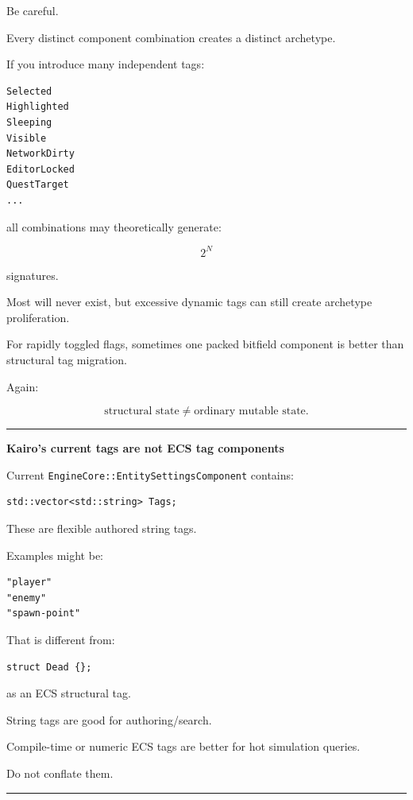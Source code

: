 Be careful.

Every distinct component combination creates a distinct archetype.

If you introduce many independent tags:

\begin{verbatim}
Selected
Highlighted
Sleeping
Visible
NetworkDirty
EditorLocked
QuestTarget
...
\end{verbatim}

all combinations may theoretically generate:

\[
2^N
\]

signatures.

Most will never exist, but excessive dynamic tags can still create archetype proliferation.

For rapidly toggled flags, sometimes one packed bitfield component is better than structural tag migration.

Again:

\[
\boxed{
\text{structural state}
\neq
\text{ordinary mutable state}.
}
\]

\begin{center}\rule{0.5\linewidth}{0.5pt}\end{center}

\textbf{Kairo's current tags are not ECS tag components}

Current \texttt{EngineCore::EntitySettingsComponent} contains:

\begin{verbatim}
std::vector<std::string> Tags;
\end{verbatim}

These are flexible authored string tags.

Examples might be:

\begin{verbatim}
"player"
"enemy"
"spawn-point"
\end{verbatim}

That is different from:

\begin{verbatim}
struct Dead {};
\end{verbatim}

as an ECS structural tag.

String tags are good for authoring/search.

Compile-time or numeric ECS tags are better for hot simulation queries.

Do not conflate them.

\begin{center}\rule{0.5\linewidth}{0.5pt}\end{center}

